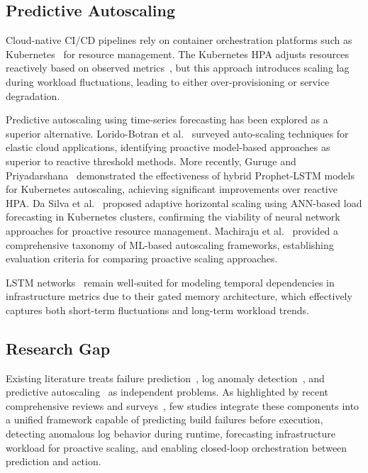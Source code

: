\documentclass[sn-nature]{sn-jnl}
\theoremstyle{thmstyleone}
\theoremstyle{thmstyletwo}
\theoremstyle{thmstylethree}
\begin{document}
\subsection{Predictive Autoscaling}\label{subsec:autoscaling}

Cloud-native CI/CD pipelines rely on container orchestration platforms such as Kubernetes~\cite{burns2016borg} for resource management. The Kubernetes HPA adjusts resources reactively based on observed metrics~\cite{kubernetesDocs}, but this approach introduces scaling lag during workload fluctuations, leading to either over-provisioning or service degradation.

Predictive autoscaling using time-series forecasting has been explored as a superior alternative. Lorido-Botran et al.~\cite{lorido2014autoscaling} surveyed auto-scaling techniques for elastic cloud applications, identifying proactive model-based approaches as superior to reactive threshold methods. More recently, Guruge and Priyadarshana~\cite{guruge2025prophet} demonstrated the effectiveness of hybrid Prophet-LSTM models for Kubernetes autoscaling, achieving significant improvements over reactive HPA. Da Silva et al.~\cite{dasilva2025adaptive} proposed adaptive horizontal scaling using ANN-based load forecasting in Kubernetes clusters, confirming the viability of neural network approaches for proactive resource management. Machiraju et al.~\cite{machiraju2026mlautoscaling} provided a comprehensive taxonomy of ML-based autoscaling frameworks, establishing evaluation criteria for comparing proactive scaling approaches.

LSTM networks~\cite{hochreiter1997lstm} remain well-suited for modeling temporal dependencies in infrastructure metrics due to their gated memory architecture, which effectively captures both short-term fluctuations and long-term workload trends.

\subsection{Research Gap}\label{subsec:gap}

Existing literature treats failure prediction~\cite{chen2016xgboost, rausch2017empirical}, log anomaly detection~\cite{du2017deeplog, le2022log, liao2025logtransformer}, and predictive autoscaling~\cite{lorido2014autoscaling, guruge2025prophet} as independent problems. As highlighted by recent comprehensive reviews and surveys~\cite{zota2025agentic, bayram2025trustworthy, machiraju2026mlautoscaling}, few studies integrate these components into a unified framework capable of predicting build failures before execution, detecting anomalous log behavior during runtime, forecasting infrastructure workload for proactive scaling, and enabling closed-loop orchestration between prediction and action.
\end{document}
